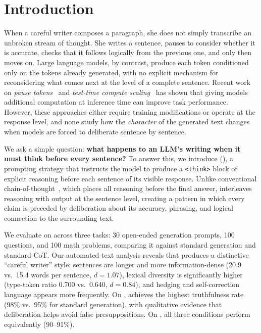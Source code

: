 \section{Introduction}
\label{sec:introduction}

When a careful writer composes a paragraph, she does not simply transcribe an unbroken stream of thought.
She writes a sentence, pauses to consider whether it is accurate, checks that it follows logically from the previous one, and only then moves on.
Large language models, by contrast, produce each token conditioned only on the tokens already generated, with no explicit mechanism for reconsidering what comes next at the level of a complete sentence.
Recent work on \emph{pause tokens}~\citep{goyal2024think} and \emph{test-time compute scaling}~\citep{snell2024scaling,muennighoff2025s1} has shown that giving models additional computation at inference time can improve task performance.
However, these approaches either require training modifications or operate at the response level, and none study how the \emph{character} of the generated text changes when models are forced to deliberate sentence by sentence.

We ask a simple question: {\bf what happens to an LLM's writing when it must think before every sentence?}
To answer this, we introduce \iscot (\iscotshort), a prompting strategy that instructs the model to produce a \texttt{<think>} block of explicit reasoning before each sentence of its visible response.
Unlike conventional chain-of-thought~\citep{wei2022chain}, which places all reasoning before the final answer, \iscotshort interleaves reasoning with output at the sentence level, creating a pattern in which every claim is preceded by deliberation about its accuracy, phrasing, and logical connection to the surrounding text.

We evaluate \iscotshort on \gptfour across three tasks: 30 open-ended generation prompts, 100 \truthfulqa questions, and 100 \gsmk math problems, comparing it against standard generation and standard CoT.
Our automated text analysis reveals that \iscotshort produces a distinctive ``careful writer'' style: sentences are longer and more information-dense (20.9 vs.\ 15.4 words per sentence, $d = 1.07$), lexical diversity is significantly higher (type-token ratio 0.700 vs.\ 0.640, $d = 0.84$), and hedging and self-correction language appears more frequently.
On \truthfulqa, \iscotshort achieves the highest truthfulness rate (98\% vs.\ 95\% for standard generation), with qualitative evidence that deliberation helps avoid false presuppositions.
On \gsmk, all three conditions perform equivalently (90--91\%).

